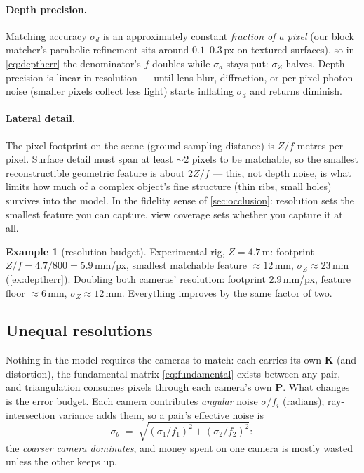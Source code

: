 \documentclass[11pt]{article}
\theoremstyle{definition}
\newtheorem{example}{Example}
\newcommand{\mat}[1]{\mathbf{#1}}
\newcommand{\K}{\mat{K}}
\newcommand{\PP}{\mat{P}}
\begin{document}
\paragraph{Depth precision.} Matching accuracy $\sigma_d$ is
an approximately constant \emph{fraction of a pixel} (our block matcher's
parabolic refinement sits around $0.1$--$0.3$\,px on textured surfaces), so
in \eqref{eq:deptherr} the denominator's $f$ doubles while $\sigma_d$ stays
put: $\sigma_Z$ halves. Depth precision is linear in resolution ---
until lens blur, diffraction, or per-pixel photon noise (smaller pixels
collect less light) starts inflating $\sigma_d$ and returns diminish.

\paragraph{Lateral detail.} The pixel footprint on the scene (ground
sampling distance) is $Z/f$ metres per pixel. Surface detail must span at
least $\sim$2 pixels to be matchable, so the smallest reconstructible
geometric feature is about $2Z/f$ --- this, not depth noise, is what limits
how much of a complex object's fine structure (thin ribs, small holes)
survives into the model. In the fidelity sense of
\autoref{sec:occlusion}: resolution sets the smallest feature you can
capture, view coverage sets whether you capture it at all.

\begin{example}[resolution budget]
\label{ex:resolution}
Experimental rig, $Z=4.7$\,m: footprint $Z/f = 4.7/800 = 5.9$\,mm/px,
smallest matchable feature $\approx12$\,mm, $\sigma_Z\approx23$\,mm
(\autoref{ex:deptherr}). Doubling both cameras' resolution:
footprint $2.9$\,mm/px, feature floor $\approx6$\,mm,
$\sigma_Z\approx12$\,mm. Everything improves by the same factor of two.
\end{example}

\subsection{Unequal resolutions}
\label{sec:heterogeneous}

Nothing in the model requires the cameras to match: each carries its own
$\K$ (and distortion), the fundamental matrix \eqref{eq:fundamental} exists
between any pair, and triangulation consumes pixels through each camera's
own $\PP$. What changes is the error budget. Each camera contributes
\emph{angular} noise $\sigma/f_i$ (radians); ray-intersection variance adds
them, so a pair's effective noise is
\begin{equation}
\sigma_\theta \;=\; \sqrt{(\sigma_1/f_1)^2+(\sigma_2/f_2)^2}:
\label{eq:hetero}
\end{equation}
the \emph{coarser camera dominates}, and money spent on one camera is
mostly wasted unless the other keeps up.
\end{document}
